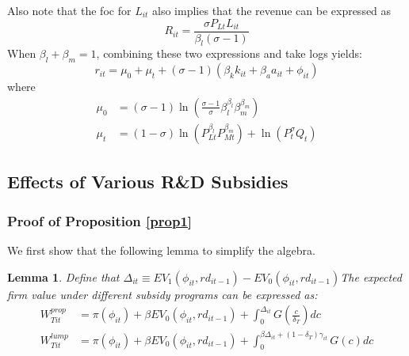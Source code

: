 \documentclass[11pt]{article}
\newtheorem*{lemma}{Lemma}
\begin{document}
Also note that the foc for $L_{it}$ also implies that the revenue
can be expressed as
\begin{equation}
R_{it}=\frac{\sigma P_{Lt}L_{it}}{\beta_{l}\left(\sigma-1\right)}
\end{equation}
 When $\beta_{l}+\beta_{m}=1$, combining these two expressions and
take logs yields:
\begin{equation}
r_{it}=\mu_{0}+\mu_{t}+\left(\sigma-1\right)\left(\beta_{k}k_{it}+\beta_{a}a_{it}+\phi_{it}\right)
\end{equation}
where 
\begin{align}
\mu_{0} & =\left(\sigma-1\right)\ln\left(\frac{\sigma-1}{\sigma}\beta_{l}^{\beta_{l}}\beta_{m}^{\beta_{m}}\right)\\
\mu_{t} & =\left(1-\sigma\right)\ln\left(P_{Lt}^{\beta_{l}}P_{Mt}^{\beta_{m}}\right)+\ln\left(P_{t}^{\sigma}Q_{t}\right)
\end{align}

\subsection{Effects of Various R\&D Subsidies} \label{subsidy_proofs}

\subsubsection*{Proof of Proposition \ref{prop1}}
We first show that the following lemma to simplify the algebra. 
\begin{lemma}
    Define that $\Delta_{it}\equiv EV_1(\phi_{it}, rd_{it-1})-EV_0(\phi_{it}, rd_{it-1})$The expected firm value under different subsidy programs can be expressed as:
    \begin{align}
    W_{Tit}^{prop}& = \pi(\phi_{it}) +\beta EV_0(\phi_{it}, rd_{it-1})+ \int_0^{\Delta_{it}}G(\frac{c}{\delta_T})dc\\
    W_{Tit}^{lump}& = \pi(\phi_{it}) +\beta EV_0(\phi_{it}, rd_{it-1})+ \int_0^{\beta \Delta_{it}+(1-\delta_T)\gamma_{it}}G(c)dc 
    \end{align}
\end{lemma}
\end{document}
